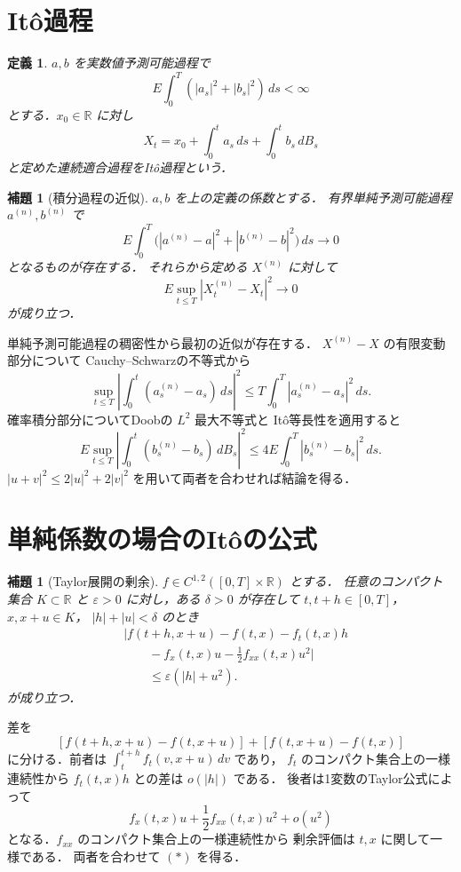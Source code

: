 \documentclass[a5paper,10pt,onecolumn]{jsarticle}
\makeatletter
\theoremstyle{mathnotetheorem}
\newtheorem{definition}[theorem]{定義}
\newtheorem{lemma}[theorem]{補題}
\renewcommand{\proofname}{証明}
\renewenvironment{proof}[1][\proofname]{%
  \par\pushQED{\qed}\normalfont\topsep4\p@\@plus2\p@\relax
  \trivlist\item[\hskip\labelsep\bfseries #1]\ignorespaces
}{\popQED\endtrivlist\@endpefalse}
\makeatother
\begin{document}
\section{It\^o過程}

\begin{definition}
$a,b$ を実数値予測可能過程で
\[
 E\int_0^T(|a_s|^2+|b_s|^2)\,ds<\infty
\]
とする．$x_0\in\mathbb R$ に対し
\[
 X_t=x_0+\int_0^ta_s\,ds+\int_0^tb_s\,dB_s
\]
と定めた連続適合過程を\emph{It\^o過程}という．
\end{definition}

\begin{lemma}[積分過程の近似]\label{lem:ito-approx}
$a,b$ を上の定義の係数とする．
有界単純予測可能過程 $a^{(n)},b^{(n)}$ で
\[
 E\int_0^T\bigl(
 |a^{(n)}-a|^2+|b^{(n)}-b|^2\bigr)\,ds\to0
\]
となるものが存在する．
それらから定める $X^{(n)}$ に対して
\[
 E\sup_{t\le T}|X_t^{(n)}-X_t|^2\to0
\]
が成り立つ．
\end{lemma}
\begin{proof}
単純予測可能過程の稠密性から最初の近似が存在する．
$X^{(n)}-X$ の有限変動部分について
Cauchy--Schwarzの不等式から
\[
 \sup_{t\le T}\left|
 \int_0^t(a^{(n)}_s-a_s)\,ds\right|^2
 \le T\int_0^T|a^{(n)}_s-a_s|^2\,ds.
\]
確率積分部分についてDoobの $L^2$ 最大不等式と
It\^o等長性を適用すると
\[
 E\sup_{t\le T}\left|
 \int_0^t(b^{(n)}_s-b_s)\,dB_s\right|^2
 \le4E\int_0^T|b^{(n)}_s-b_s|^2\,ds.
\]
$|u+v|^2\le2|u|^2+2|v|^2$ を用いて両者を合わせれば結論を得る．
\end{proof}

\section{単純係数の場合のIt\^oの公式}

\begin{lemma}[Taylor展開の剰余]\label{lem:taylor}
$f\in C^{1,2}([0,T]\times\mathbb R)$ とする．
任意のコンパクト集合 $K\subset\mathbb R$ と
$\varepsilon>0$ に対し，ある $\delta>0$ が存在して
$t,t+h\in[0,T]$，$x,x+u\in K$，
$|h|+|u|<\delta$ のとき
\[
 \begin{aligned}
 &\bigl|f(t+h,x+u)-f(t,x)-f_t(t,x)h\\
 &\qquad{}-f_x(t,x)u-\tfrac12 f_{xx}(t,x)u^2\bigr|\\
 &\qquad\le\varepsilon(|h|+u^2).
 \end{aligned}
 \tag{$*$}
\]
が成り立つ．
\end{lemma}
\begin{proof}
差を
\[
 [f(t+h,x+u)-f(t,x+u)]
 +[f(t,x+u)-f(t,x)]
\]
に分ける．前者は
$\int_t^{t+h}f_t(v,x+u)\,dv$ であり，
$f_t$ のコンパクト集合上の一様連続性から
$f_t(t,x)h$ との差は
$o(|h|)$ である．
後者は1変数のTaylor公式によって
\[
 f_x(t,x)u+\frac12f_{xx}(t,x)u^2+o(u^2)
\]
となる．$f_{xx}$ のコンパクト集合上の一様連続性から
剰余評価は $t,x$ に関して一様である．
両者を合わせて $(*)$ を得る．
\end{proof}
\end{document}
